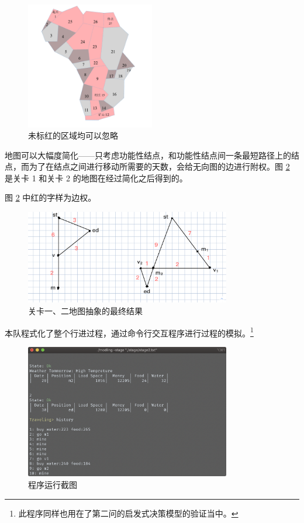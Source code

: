 \documentclass[a4paper]{ctexart}
\begin{document}
\begin{figure}[htpb]
    \centering
    \includegraphics[width=0.5\textwidth]{./pictures/statge1_simple.png}
    \caption{未标红的区域均可以忽略}
    \label{fig:stage1-shade}
\end{figure}

地图可以大幅度简化——只考虑功能性结点，和功能性结点间一条最短路径上的结点，而为了在结点之间进行移动所需要的天数，会给无向图的边进行附权。图 \ref{fig:simplified-1-and-2} 是关卡 1 和关卡 2 的地图在经过简化之后得到的。

图 \ref{fig:simplified-1-and-2} 中红的字样为边权。

\begin{figure}[htpb]
    \centering
    \includegraphics[width=0.8\textwidth]{./pictures/simplified.png}
    \caption{关卡一、二地图抽象的最终结果}
    \label{fig:simplified-1-and-2}
\end{figure}

本队程式化了整个行进过程，通过命令行交互程序进行过程的模拟。\footnote{此程序同样也用在了第二问的启发式决策模型的验证当中。}

\begin{figure}[htpb]
    \centering
    \includegraphics[width=0.8\textwidth]{./pictures/screenshot.png}
    \caption{程序运行截图}
    \label{fig:sscreenshot}
\end{figure}
\end{document}
